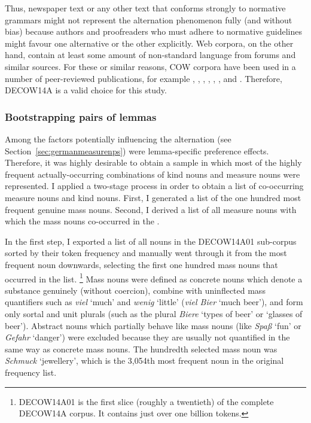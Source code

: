 Thus, newspaper text or any other text that conforms strongly to normative grammars might not represent the alternation phenomenon fully (and without bias) because authors and proofreaders who must adhere to normative guidelines might favour one alternative or the other explicitly.
Web corpora, on the other hand, contain at least some amount of non-standard language from forums and similar sources.
For these or similar reasons, COW corpora have been used in a number of peer-reviewed publications, for example \cite{VanGoethemHiligsmann2014}, \cite{VanGoethemHuening2015}, \cite{MuellerS2014}, \cite{Schaefer2016c}, \cite{SchaeferSayatz2014}, \cite{SchaeferSayatz2016}, and \cite{Zimmer2015}. 
Therefore, DECOW14A is a valid choice for this study.


\subsubsection{Bootstrapping pairs of lemmas}
\label{sec:bootstrappinlemmapairs}

Among the factors potentially influencing the alternation (see Section~\ref{sec:germanmeasurenps}) were lemma-specific preference effects.
Therefore, it was highly desirable to obtain a sample in which most of the highly frequent actually-occurring combinations of kind nouns and measure nouns were represented.
I applied a two-stage process in order to obtain a list of co-occurring measure nouns and kind nouns.
First, I generated a list of the one hundred most frequent genuine mass nouns.
Second, I derived a list of all measure nouns with which the mass nouns co-occurred in the \NACb.

In the first step, I exported a list of all nouns in the DECOW14A01 sub-corpus sorted by their token frequency and manually went through it from the most frequent noun downwards, selecting the first one hundred mass nouns that occurred in the list.%
\footnote{DECOW14A01 is the first slice (roughly a twentieth) of the complete DECOW14A corpus.
It contains just over one billion tokens.}
Mass nouns were defined as concrete nouns which denote a substance genuinely (without coercion), combine with uninflected mass quantifiers such as \textit{viel} `much' and \textit{wenig} `little' (\textit{viel Bier} `much beer'), and form only sortal and unit plurals (such as the plural \textit{Biere} `types of beer' or `glasses of beer').
Abstract nouns which partially behave like mass nouns (like \textit{Spaß} `fun’ or \textit{Gefahr} `danger’) were excluded because they are usually not quantified in the same way as concrete mass nouns.
The hundredth selected mass noun was \textit{Schmuck} `jewellery’, which is the 3,054th most frequent noun in the original frequency list.

